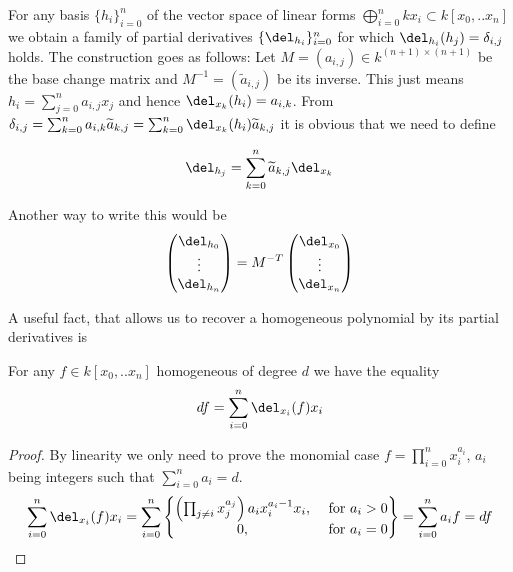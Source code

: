 \begin{example}
For any basis $\{ h_i\}_{i=0}^n$ of the vector space of linear forms $\bigoplus_{i=0}^n kx_i \subset k[x_0,..x_n]$ we obtain a family of partial derivatives $\{ \del_{h_i} \}_{i=0}^n$ for which $\del_{h_i}(h_j) = \delta_{i,j}$ holds. The construction goes as follows: Let $M = (a_{i,j})  \in k^{(n+1)\times(n+1)}$ be the base change matrix and $M^{-1} = (\widetilde a_{i,j})$ be its inverse.
This just means $h_i = \sum_{j=0}^n a_{i,j} x_j$ and hence $\del_{x_k}(h_i) = a_{i,k}$.
From $\delta_{i,j} = \sum_{k=0}^n a_{i,k}\widetilde a_{k,j}
= \sum_{k=0}^n \del_{x_k}(h_i) \widetilde a_{k,j}$ it is obvious that we need to define

\begin{equation}
\del_{h_j} = \sum_{k=0}^n \widetilde a_{k,j} \del_{x_k}
\end{equation}

Another way to write this would be
\begin{equation}
\begin{pmatrix} \del_{h_0} \\ \vdots \\ \del_{h_n} \end{pmatrix}
= M^{-T}
\begin{pmatrix} \del_{x_0} \\ \vdots \\ \del_{x_n} \end{pmatrix}
\end{equation}
\end{example}

A useful fact, that allows us to recover a homogeneous polynomial by its partial derivatives is

\begin{proposition}
For any $f \in k[x_0,..x_n]$ homogeneous of degree $d$ we have the equality
\[ df = \sum_{i=0}^n \del_{x_i}(f)x_i \]
\end{proposition}
\begin{proof}
By linearity we only need to prove the monomial case $f = \prod_{i=0}^n x_i^{a_i}$, $a_i$ being integers such that $\sum_{i=0}^n a_i = d$.
\begin{equation}
\sum_{i=0}^n \del_{x_i}(f)x_i
= \sum_{i=0}^n \begin{Bmatrix} \left(\prod_{j\neq i} x_j^{a_j}\right) a_i x_i^{a_i-1} x_i, & \text{ for } a_i > 0
\\ 0, &\text{ for } a_i = 0 \end{Bmatrix}
= \sum_{i=0}^n a_i f = df
\end{equation}
\end{proof}

